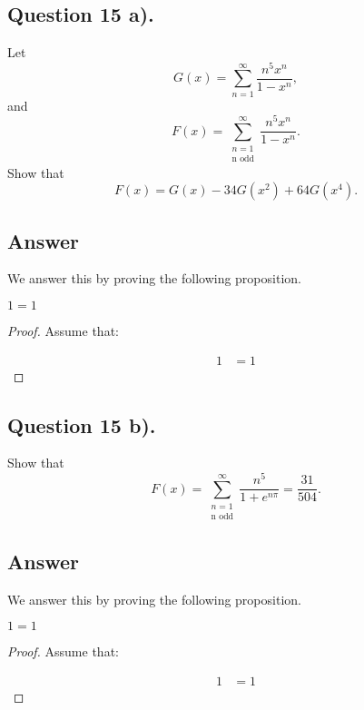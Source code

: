 \subsection{Question 15 a).}
\noindent
Let
\[
    G(x)=\sum_{n=1}^{\infty} \frac{n^5 x^n}{1-x^n},
\]
and
\[
    F(x)=\sum_{\substack{n=1\\ \text{n odd}}}^{\infty} \frac{n^5 x^n}{1-x^n}.
\]
Show that
\[
    F(x)=G(x)-34G(x^2)+64G(x^4).
\]

\subsection*{Answer}
\noindent
We answer this by proving the following proposition.

\begin{proposition}
    $1=1$
\end{proposition}

\begin{proof}
    Assume that:

    \begin{align*}
        1 &= 1
    \end{align*}

\end{proof}


\subsection{Question 15 b).}
\noindent
Show that
\[
    F(x)=\sum_{\substack{n=1\\ \text{n odd}}}^{\infty} \frac{n^5}{1+e^{n\pi}} = \frac{31}{504}.
\]

\subsection*{Answer}
\noindent
We answer this by proving the following proposition.

\begin{proposition}
    $1=1$
\end{proposition}

\begin{proof}
    Assume that:

    \begin{align*}
        1 &= 1
    \end{align*}

\end{proof}
